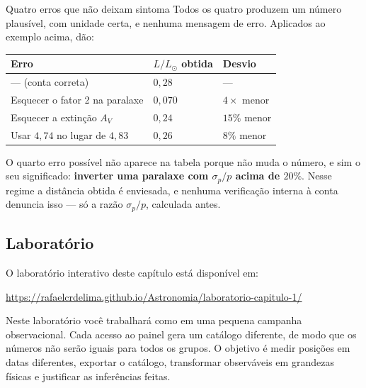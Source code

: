 \documentclass[11pt,a4paper]{article}
\begin{document}
\begin{lessonblock}[borderline west={2pt}{0pt}{astroBlue}]{Quatro erros que não deixam sintoma}
Todos os quatro produzem um número plausível, com unidade certa, e nenhuma mensagem de erro. Aplicados ao exemplo acima, dão:

\begin{tabular}{>{\raggedright\arraybackslash}p{}>{\raggedright\arraybackslash}p{}>{\raggedright\arraybackslash}p{}}
\toprule
Erro & $L/L_\odot$ obtida & Desvio \\
\midrule
--- (conta correta) & $0{,}28$ & --- \\
Esquecer o fator 2 na paralaxe & $0{,}070$ & $4\times$ menor \\
Esquecer a extinção $A_V$ & $0{,}24$ & $15\%$ menor \\
Usar $4{,}74$ no lugar de $4{,}83$ & $0{,}26$ & $8\%$ menor \\
\bottomrule
\end{tabular}

\medskip
O quarto erro possível não aparece na tabela porque não muda o número, e sim o seu significado: \textbf{inverter uma paralaxe com $\sigma_p/p$ acima de $20\%$}. Nesse regime a distância obtida é enviesada, e nenhuma verificação interna à conta denuncia isso --- só a razão $\sigma_p/p$, calculada antes.
\end{lessonblock}

\subsection*{Laboratório}
O laboratório interativo deste capítulo está disponível em:

\begin{center}
\url{https://rafaelcrdelima.github.io/Astronomia/laboratorio-capitulo-1/}
\end{center}

Neste laboratório você trabalhará como em uma pequena campanha observacional. Cada acesso ao painel gera um catálogo diferente, de modo que os números não serão iguais para todos os grupos. O objetivo é medir posições em datas diferentes, exportar o catálogo, transformar observáveis em grandezas físicas e justificar as inferências feitas.
\end{document}

